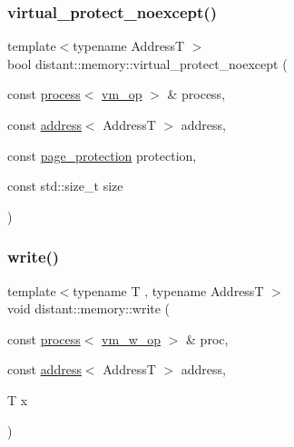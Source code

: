 \mbox{\label{namespacedistant_1_1memory_a3819d0b0d2faf36f55bb8221618f6fc0}} 
\subsubsection{\texorpdfstring{virtual\+\_\+protect\+\_\+noexcept()}{virtual\_protect\_noexcept()}}
{\footnotesize\ttfamily template$<$typename AddressT $>$ \\
bool distant\+::memory\+::virtual\+\_\+protect\+\_\+noexcept (\begin{DoxyParamCaption}\item[{const \mbox{\hyperlink{classdistant_1_1kernel__objects_1_1process}{process}}$<$ \mbox{\hyperlink{namespacedistant_af02d4223cd2f509cc373ac9d83655f19}{vm\+\_\+op}} $>$ \&}]{process,  }\item[{const \mbox{\hyperlink{classdistant_1_1memory_1_1address}{address}}$<$ AddressT $>$}]{address,  }\item[{const \mbox{\hyperlink{structdistant_1_1access__rights_a09c6caea8f570f8e2d18c3ef2e2a7804}{page\+\_\+protection}}}]{protection,  }\item[{const std\+::size\+\_\+t}]{size }\end{DoxyParamCaption})\hspace{0.3cm}{\ttfamily [noexcept]}}

\mbox{\label{namespacedistant_1_1memory_adaa15cd72b1436e24239d70964bf3323}} 
\subsubsection{\texorpdfstring{write()}{write()}\hspace{0.1cm}{\footnotesize\ttfamily [1/2]}}
{\footnotesize\ttfamily template$<$typename T , typename AddressT $>$ \\
void distant\+::memory\+::write (\begin{DoxyParamCaption}\item[{const \mbox{\hyperlink{classdistant_1_1kernel__objects_1_1process}{process}}$<$ \mbox{\hyperlink{namespacedistant_a6312277824ed2f04c414a61f24c135bb}{vm\+\_\+w\+\_\+op}} $>$ \&}]{proc,  }\item[{const \mbox{\hyperlink{classdistant_1_1memory_1_1address}{address}}$<$ AddressT $>$}]{address,  }\item[{T}]{x }\end{DoxyParamCaption})}

